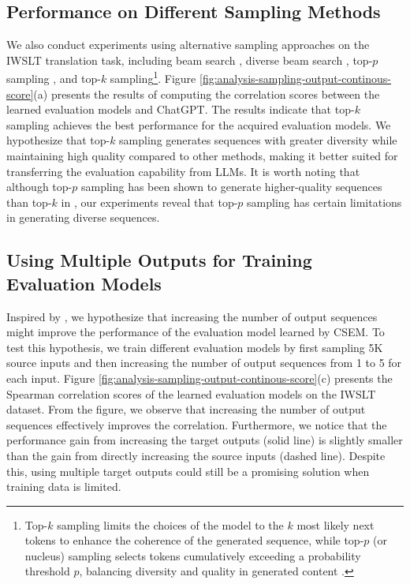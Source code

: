 \documentclass[lettersize,journal]{IEEEtran}
\begin{document}
\subsection{Performance on Different Sampling Methods}
We also conduct experiments using alternative sampling approaches on the IWSLT translation task, including beam search \cite{freitag2017beam}, diverse beam search \cite{roberts2020decoding}, top-$p$ sampling \cite{holtzman2019curious}, and top-$k$ sampling\footnote{Top-$k$ sampling limits the choices of the model to the $k$ most likely next tokens to enhance the coherence of the generated sequence, while top-$p$ (or nucleus) sampling selects tokens cumulatively exceeding a probability threshold $p$, balancing diversity and quality in generated content \cite{holtzman2019curious}.}. Figure \ref{fig:analysis-sampling-output-continous-score}(a) presents the results of computing the correlation scores between the learned evaluation models and ChatGPT. The results indicate that top-$k$ sampling achieves the best performance for the acquired evaluation models. We hypothesize that top-$k$ sampling generates sequences with greater diversity while maintaining high quality compared to other methods, making it better suited for transferring the evaluation capability from LLMs. It is worth noting that although top-$p$ sampling has been shown to generate higher-quality sequences than top-$k$ in \cite{holtzman2019curious}, our experiments reveal that top-$p$ sampling has certain limitations in generating diverse sequences.

\subsection{Using Multiple Outputs for Training Evaluation Models}
Inspired by \cite{freitag2021experts}, we hypothesize that increasing the number of output sequences might improve the performance of the evaluation model learned by CSEM. To test this hypothesis, we train different evaluation models by first sampling 5K source inputs and then increasing the number of output sequences from 1 to 5 for each input. Figure \ref{fig:analysis-sampling-output-continous-score}(c) presents the Spearman correlation scores of the learned evaluation models on the IWSLT dataset. From the figure, we observe that increasing the number of output sequences effectively improves the correlation. Furthermore, we notice that the performance gain from increasing the target outputs (solid line) is slightly smaller than the gain from directly increasing the source inputs (dashed line). Despite this, using multiple target outputs could still be a promising solution when training data is limited.
\end{document}
